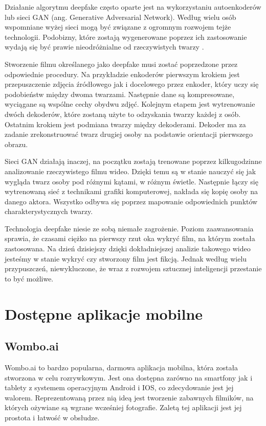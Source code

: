 Działanie algorytmu deepfake często oparte jest na wykorzystaniu autoenkoderów lub sieci GAN (ang. Generative Adversarial Network). Według wielu osób wspomniane wyżej sieci mogą być związane z ogromnym rozwojem tejże technologii. Podobizny, które zostają wygenerowane poprzez ich zastosowanie wydają się być prawie nieodróżnialne od rzeczywistych twarzy \cite{deepfake}.

Stworzenie filmu określanego jako deepfake musi zostać poprzedzone przez odpowiednie procedury. Na przykładzie enkoderów pierwszym krokiem jest przepuszczenie zdjęcia źródłowego jak i docelowego przez enkoder, który uczy się podobieństw między dwoma twarzami. Następnie dane są kompresowane, wyciągane są wspólne cechy obydwu zdjęć. Kolejnym etapem jest wytrenowanie dwóch dekoderów, które zostaną użyte to odzyskania twarzy każdej z osób. Ostatnim krokiem jest podmiana twarzy między dekoderami. Dekoder ma za zadanie zrekonstruować twarz drugiej osoby na podstawie orientacji pierwszego obrazu. 

Sieci GAN działają inaczej, na początku zostają trenowane poprzez kilkugodzinne analizowanie rzeczywistego filmu wideo. Dzięki temu są w stanie nauczyć się jak wygląda twarz osoby pod różnymi kątami, w różnym świetle. Następnie łączy się wytrenowaną sieć z technikami grafiki komputerowej, nakłada się kopię osoby na danego aktora. Wszystko odbywa się poprzez mapowanie odpowiednich punktów charakterystycznych twarzy.

Technologia deepfake niesie ze sobą niemałe zagrożenie. Poziom zaawansowania sprawia, że czasami ciężko na pierwszy rzut oka wykryć film, na którym została zastosowana. Na dzień dzisiejszy dzięki dokładniejszej analizie takowego wideo jesteśmy w stanie wykryć czy stworzony film jest fikcją. Jednak według wielu przypuszczeń, niewykluczone, że wraz z rozwojem sztucznej inteligencji przestanie to być możliwe.


\section{Dostępne aplikacje mobilne}

\subsection{Wombo.ai}
Wombo.ai \cite{womboai} to bardzo popularna, darmowa aplikacja mobilna, która została stworzona w celu rozrywkowym. Jest ona dostępna zarówno na smartfony jak i tablety z systemem operacyjnym Android i IOS, co zdecydowanie jest jej walorem. Reprezentowaną przez nią ideą jest tworzenie zabawnych filmików, na których ożywiane są wgrane wcześniej fotografie. Zaletą tej aplikacji jest jej prostota i łatwość w obsłudze. 

